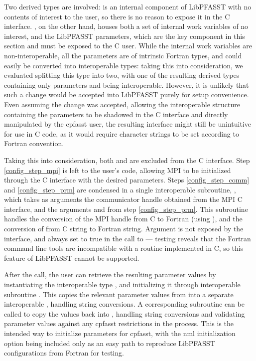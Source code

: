 Two derived types are involved:  is an internal component of LibPFASST with no contents of interest to the user, so there is no reason to expose it in the C interface. , on the other hand, houses both a set of internal work variables of no interest, and the LibPFASST parameters, which are the key component in this section and must be exposed to the C user. While the internal work variables are non-interoperable, all the parameters are of intrinsic Fortran types, and could easily be converted into interoperable types: taking this into consideration, we evaluated splitting this type into two, with one of the resulting derived types containing only parameters and being interoperable. However, it is unlikely that such a change would be accepted into LibPFASST purely for setup convenience. Even assuming the change was accepted, allowing the interoperable structure containing the parameters to be shadowed in the C interface and directly manipulated by the cpfasst user, the resulting interface might still be unintuitive for use in C code, as it would require character strings to be set according to Fortran convention.

Taking this into consideration, both  and  are excluded from the C interface. Step \ref{config_step_mpi} is left to the user's code, allowing MPI to be initialized through the C interface with the desired parameters. Steps \ref{config_step_comm} and \ref{config_step_prm} are condensed in a single interoperable subroutine, , which takes as arguments the communicator handle obtained from the MPI C interface, and the arguments  and  from step \ref{config_step_prm}. This subroutine handles the conversion of the MPI handle from C to Fortran (using ), and the conversion of  from C string to Fortran string. Argument  is not exposed by the interface, and always set to true in the call to  --- testing reveals that the Fortran command line tools are incompatible with a  routine implemented in C, so this feature of LibPFASST cannot be supported.

After the  call, the user can retrieve the resulting parameter values by instantiating the interoperable type , and initializing it through interoperable subroutine . This copies the relevant parameter values from  into a separate interoperable , handling string conversions. A corresponding subroutine  can be called to copy the values back into , handling string conversions and validating parameter values against any cpfasst restrictions in the process. This is the intended way to initialize parameters for cpfasst, with the nml initialization option being included only as an easy path to reproduce LibPFASST configurations from Fortran for testing.

